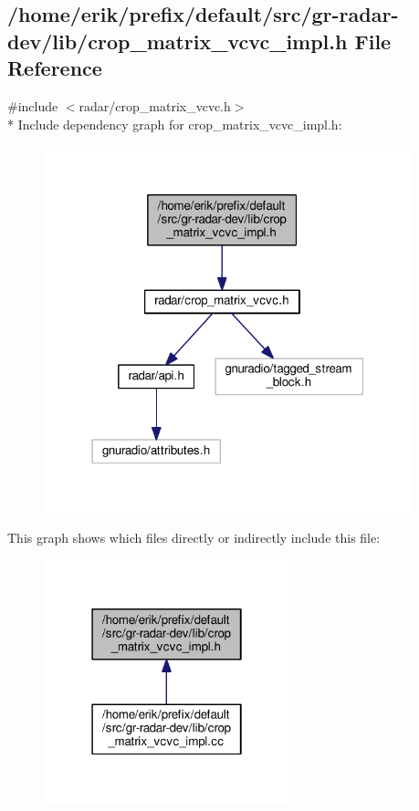 \subsection{/home/erik/prefix/default/src/gr-\/radar-\/dev/lib/crop\+\_\+matrix\+\_\+vcvc\+\_\+impl.h File Reference}
\label{crop__matrix__vcvc__impl_8h}
{\ttfamily \#include $<$radar/crop\+\_\+matrix\+\_\+vcvc.\+h$>$}\\*
Include dependency graph for crop\+\_\+matrix\+\_\+vcvc\+\_\+impl.\+h\+:
\nopagebreak
\begin{figure}[H]
\begin{center}
\leavevmode
\includegraphics[width=302pt]{d8/d50/crop__matrix__vcvc__impl_8h__incl}
\end{center}
\end{figure}
This graph shows which files directly or indirectly include this file\+:
\nopagebreak
\begin{figure}[H]
\begin{center}
\leavevmode
\includegraphics[width=202pt]{d0/d12/crop__matrix__vcvc__impl_8h__dep__incl}
\end{center}
\end{figure}

